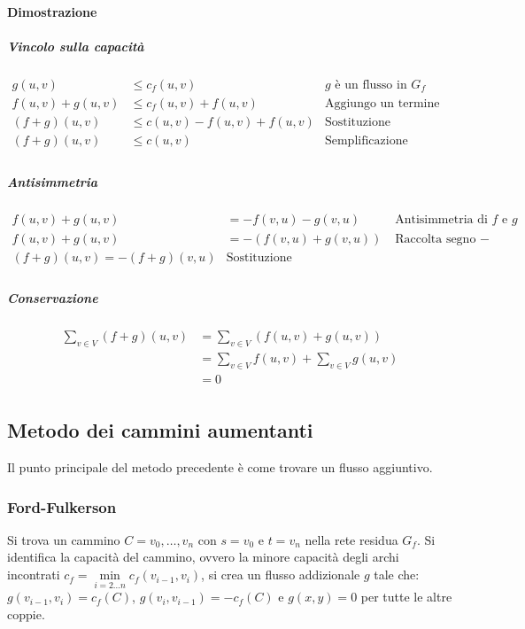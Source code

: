 \paragraph{Dimostrazione}
\subparagraph{Vincolo sulla capacit\`a}
\begin{align*}
	g(u, v) & \le c_f(u, v) \quad\quad & \text{$g$ \`e un flusso in $G_f$}\\
	f(u, v) + g(u, v) & \le c_f(u, v) + f(u, v) & \text{Aggiungo un termine uguale}\\
	(f+g)(u, v) & \le c(u, v) - f(u, v) + f(u, v) & \text{Sostituzione}\\
	(f+g)(u, v) & \le c(u, v) & \text{Semplificazione}\\
\end{align*}
\subparagraph{Antisimmetria}
\begin{align*}
	f(u, v) + g(u, v) & = -f(v, u) - g(v, u) \quad\quad & \text{Antisimmetria di $f$ e $g$}\\
	f(u, v) + g(u, v) & = -(f(v, u) + g(v, u)) & \text{Raccolta segno $-$}\\
	(f+g)(u, v) = -(f+g)(v, u) & \text{Sostituzione}\\
\end{align*}
\subparagraph{Conservazione}
\begin{align*}
	\sum\limits_{v\in V} (f+g)(u, v) & = \sum\limits_{v\in V}(f(u, v) + g(u, v))\\
					 & = \sum\limits_{v\in V} f(u, v) + \sum\limits_{v\in V} g(u, v)\\
					 & = 0\\
\end{align*}
\subsection{Metodo dei cammini aumentanti}
Il punto principale del metodo precedente \`e come trovare un flusso aggiuntivo.
\subsubsection{Ford-Fulkerson}
Si trova un cammino $C=v_0, \dots, v_n$ con $s = v_0$ e $t= v_n$ nella rete residua $G_f$. Si identifica la capacit\`a del cammino, ovvero la minore capacit\`a degli archi incontrati
$c_f = \min\limits_{i = 2\dots n}c_f(v_{i-1}, v_i)$, si crea un flusso addizionale $g$ tale che: $g(v_{i-1}, v_i) = c_f(C)$, $g(v_i, v_{i-1}) = -c_f(C)$ e $g(x, y) = 0$ per tutte le 
altre coppie.\\ 


